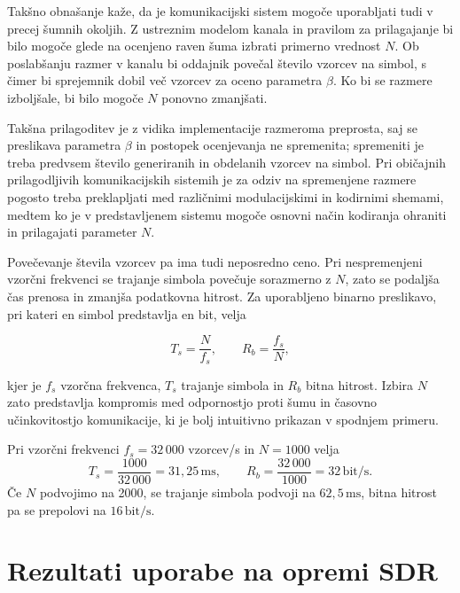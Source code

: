 \documentclass[a4paper, 12pt, openany]{book}
\begin{document}
Takšno obnašanje kaže, da je komunikacijski sistem mogoče uporabljati tudi v precej šumnih okoljih. Z ustreznim modelom kanala in pravilom za prilagajanje bi bilo mogoče glede na ocenjeno raven šuma izbrati primerno vrednost $N$. Ob poslabšanju razmer v kanalu bi oddajnik povečal število vzorcev na simbol, s čimer bi sprejemnik dobil več vzorcev za oceno parametra $\beta$. Ko bi se razmere izboljšale, bi bilo mogoče $N$ ponovno zmanjšati.

Takšna prilagoditev je z vidika implementacije razmeroma preprosta, saj se preslikava parametra $\beta$ in postopek ocenjevanja ne spremenita; spremeniti je treba predvsem število generiranih in obdelanih vzorcev na simbol. Pri običajnih prilagodljivih komunikacijskih sistemih je za odziv na spremenjene razmere pogosto treba preklapljati med različnimi modulacijskimi in kodirnimi shemami, medtem ko je v predstavljenem sistemu mogoče osnovni način kodiranja ohraniti in prilagajati parameter $N$.

Povečevanje števila vzorcev pa ima tudi neposredno ceno. Pri nespremenjeni vzorčni frekvenci se trajanje simbola povečuje sorazmerno z $N$, zato se podaljša čas prenosa in zmanjša podatkovna hitrost. Za uporabljeno binarno preslikavo, pri kateri en simbol predstavlja en bit, velja

\begin{equation}
T_s=\frac{N}{f_s},
\qquad
R_b=\frac{f_s}{N},
\end{equation}

kjer je $f_s$ vzorčna frekvenca, $T_s$ trajanje simbola in $R_b$ bitna hitrost. Izbira $N$ zato predstavlja kompromis med odpornostjo proti šumu in časovno učinkovitostjo komunikacije, ki je bolj intuitivno prikazan v spodnjem primeru.

\begin{tcolorbox}[colback=purple!5!white,colframe=purple!50!black,
title=Primer vpliva števila vzorcev na hitrost prenosa]
Pri vzorčni frekvenci $f_s=32\,000$ vzorcev/s in $N=1000$ velja
\[
T_s=\frac{1000}{32\,000}=31{,}25\,\mathrm{ms},
\qquad
R_b=\frac{32\,000}{1000}=32\,\mathrm{bit/s}.
\]
Če $N$ podvojimo na 2000, se trajanje simbola podvoji na $62{,}5\,\mathrm{ms}$, bitna hitrost pa se prepolovi na $16\,\mathrm{bit/s}$.
\end{tcolorbox}

\section{Rezultati uporabe na opremi SDR}
\end{document}
